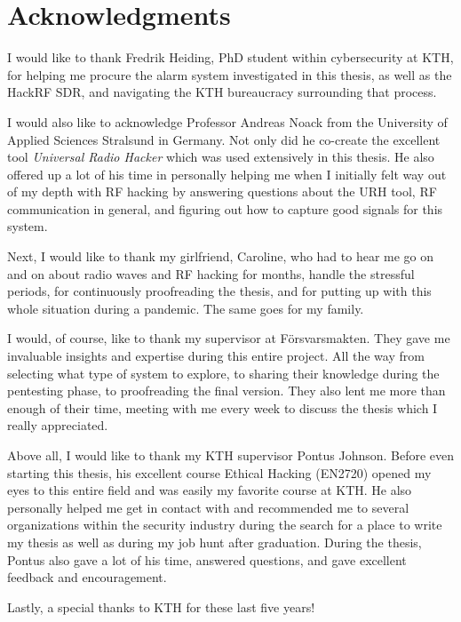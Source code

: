 \clearpage

\section*{Acknowledgments}
I would like to thank Fredrik Heiding, PhD student within cybersecurity at KTH, for helping me procure the alarm system investigated in this thesis, as well as the HackRF SDR, and navigating the KTH bureaucracy surrounding that process.

I would also like to acknowledge Professor Andreas Noack from the University of Applied Sciences Stralsund in Germany. Not only did he co-create the excellent tool \textit{Universal Radio Hacker} which was used extensively in this thesis. He also offered up a lot of his time in personally helping me when I initially felt way out of my depth with RF hacking by answering questions about the URH tool, RF communication in general, and figuring out how to capture good signals for this system.

Next, I would like to thank my girlfriend, Caroline, who had to hear me go on and on about radio waves and RF hacking for months, handle the stressful periods, for continuously proofreading the thesis, and for putting up with this whole situation during a pandemic. The same goes for my family.

I would, of course, like to thank my supervisor at Försvarsmakten. They gave me invaluable insights and expertise during this entire project. All the way from selecting what type of system to explore, to sharing their knowledge during the pentesting phase, to proofreading the final version. They also lent me more than enough of their time, meeting with me every week to discuss the thesis which I really appreciated.

Above all, I would like to thank my KTH supervisor Pontus Johnson. Before even starting this thesis, his excellent course Ethical Hacking (EN2720) opened my eyes to this entire field and was easily my favorite course at KTH. He also personally helped me get in contact with and recommended me to several organizations within the security industry during the search for a place to write my thesis as well as during my job hunt after graduation. During the thesis, Pontus also gave a lot of his time, answered questions, and gave excellent feedback and encouragement.

Lastly, a special thanks to KTH for these last five years!

\acknowlegmentssignature

\tableofcontents
\markboth{\contentsname}{}

\clearpage\listoffigures
\clearpage\listoftables
\clearpage\printglossary[type=\acronymtype, title={List of acronyms and abbreviations}]
